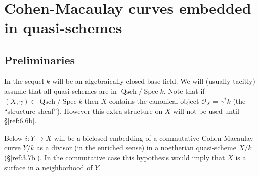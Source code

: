 \documentclass{amsproc}
\def\Oscr{{\mathcal O}}
\def\QSch{\operatorname{Qsch}}
\def\Spec{\operatorname {Spec}}
\def\r{\rightarrow}
\theoremstyle{definition}
\theoremstyle{remark}
\numberwithin{equation}{section}
\numberwithin{table}{section}
\numberwithin{figure}{section}
\begin{document}
\section{Cohen-Macaulay curves embedded in quasi-schemes}
\label{ref:5a}


\subsection{Preliminaries}
\label{ref:5.1a}
In the sequel $k$ will be an algebraically closed base field. We will
(usually tacitly) assume that all quasi-schemes are in $\QSch/\Spec
k$. Note that if $(X,\gamma)\in \QSch/\Spec k$ then $X$ contains the
canonical object $\Oscr_X=\gamma^\ast k$ (the ``structure
sheaf''). However this extra structure on $X$ will not be used until
\S\ref{ref:6.6b}. 



Below $i:Y\r X$ will be a biclosed embedding of a commutative
Cohen-Macaulay curve $Y/k$ as a divisor (in the enriched sense) in a
noetherian quasi-scheme $X/k$ (\S\ref{ref:3.7b}).  In the commutative
case this hypothesis would imply that $X$ is a surface in a
neighborhood of $Y$.
\end{document}

